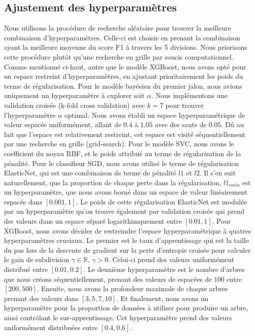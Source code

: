 \documentclass{article}
\begin{document}
\subsection{Ajustement des hyperparamètres}
Nous utilisons la procédure de recherche aléatoire pour trouver la meilleure combinaison d'hyperparamètres. Celle-ci est choisie en prenant la combinaison ayant la meilleure moyenne du score F1 à travers les 5 divisions. Nous priorisons cette procédure plutôt qu'une recherche en grille par soucis computationnel. Comme mentionné ci-haut, autre que le modèle XGBoost, nous avons opté pour un espace restreint d'hyperparamètres, en ajustant prioritairement les poids du terme de régularisation. 
Pour le modèle bayésien du premier jalon, nous avions uniquement un hyperparamètre à explorer soit $\alpha$. Nous implémentons une validation croisée (k-fold cross validation) avec $k = 7$ pour trouver l'hyperparamètre $\alpha$ optimal. Nous avons établi un espace hyperparamétrique de valeur espacée uniformément, allant de $0.4$ à $1.05$ avec des sauts de $0.05$. Dû au fait que l'espace est relativement restreint, cet espace est visité séquentiellement par une recherche en grille (grid-search). Pour le modèle SVC, nous avons le coefficient du noyau RBF, et le poids attribué au terme de régularisation de la pénalité. Pour le classifieur SGD, nous avons utilisé le terme de régularisation ElasticNet, qui est une combinaison de terme de pénalité $l1$ et $l2$. Il s'en suit naturellement, que la proportion de chaque perte dans la régularisation, $l1_{ratio}$ est un hyperparamètre, que nous avons borné dans un espace de valeur linéairement espacée dans $[0.001, 1]$. Le poids de cette régularisation ElasticNet est modulée par un hyperparamètre qu'on trouve également par validation croisée qui prend des valeurs dans un espace séparé logarithimquement entre $[0.01, 1]$. Pour XGBoost, nous avons décider de restreindre l'espace hyperparamétrique à quatres hyperparamètres cruciaux. Le premier est le taux d'apprentissage qui est la taille du pas lors de la descente de gradient sur la perte d'entropie croisée pour calculer le gain de subdivision $\gamma \in \mathbb{R}$, $\gamma > 0$. Celui-ci prend des valeurs uniformément distribué entre $[0.01, 0.2]$. Le deuxième hyperparamètre est le nombre d'arbres que nous créons séquentiellement, prenant des valeurs de espacées de $100$ entre $[200, 500]$. Ensuite, nous avons la profondeur maximale de chaque arbres prenant des valeurs dans $[3, 5, 7, 10]$. Et finalement, nous avons un hyperparamètre pour la proportion de données à utiliser pour produire un arbre, ainsi contrôlant le sur-apprentissage. Cet hyperparamètre prend des valeurs uniformément distribuées entre $[0.4, 0.6]$.
\end{document}
